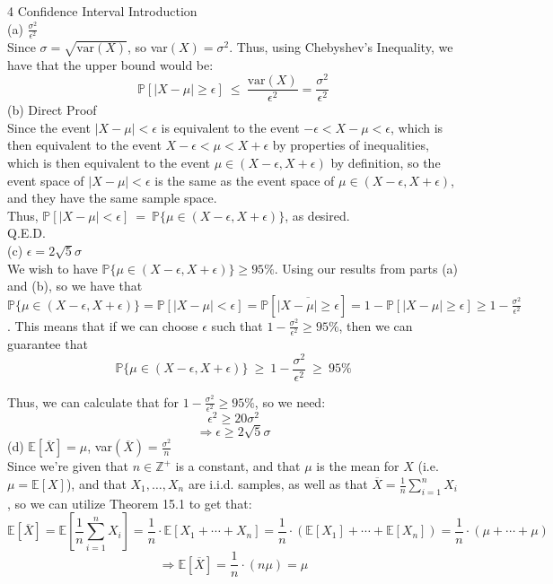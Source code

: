 \documentclass{article}
\begin{document}
{\Large 4 Confidence Interval Introduction} \\[.5cm]
{\color{red} (a) $\frac{\sigma^2}{\epsilon^2}$ } \\

Since $\sigma = \sqrt{\text{var}(X)}$, so var$(X) = \sigma^2$. Thus, using Chebyshev's Inequality, we have that the upper bound would be:
$$\mathbb{P}[|X-\mu| \geq \epsilon]\ \leq\ \frac{\text{var}(X)}{\epsilon^2} = \frac{\sigma^2}{\epsilon^2}$$
{\color{red} (b) Direct Proof } \\

Since the event $|X-\mu|<\epsilon$
is equivalent to the event $-\epsilon < X-\mu < \epsilon$,
which is then equivalent to the event $X-\epsilon < \mu < X+\epsilon$ by properties of inequalities,
which is then equivalent to the event $\mu\in(X-\epsilon, X+\epsilon)$ by definition,
so the event space of $|X-\mu|<\epsilon$ is the same as the event space of $\mu\in(X-\epsilon, X+\epsilon)$, and they have the same sample space. \\

Thus, $\mathbb{P}[|X-\mu|<\epsilon]\ =\
\mathbb{P}\big\{\mu\in(X-\epsilon, X+\epsilon)\big\}$, as desired. \\

Q.E.D. \\[.5cm]
{\color{red} (c) $\epsilon = 2\sqrt{5}\sigma$ } \\

We wish to have $\mathbb{P}\big\{\mu\in(X-\epsilon, X+\epsilon)\big\} \geq95\%$. Using our results from parts (a) and (b), so we have that
$\mathbb{P}\big\{\mu\in(X-\epsilon, X+\epsilon)\big\} =
\mathbb{P}[|X-\mu|<\epsilon] =
\mathbb{P}[\overline{|X-\mu|\geq\epsilon}] =
1 - \mathbb{P}[|X-\mu|\geq\epsilon] \geq
1 - \frac{\sigma^2}{\epsilon^2}$. This means that if we can choose $\epsilon$ such that $1 - \frac{\sigma^2}{\epsilon^2}\geq95\%$, then we can guarantee that
$$\mathbb{P}\big\{\mu\in(X-\epsilon, X+\epsilon)\big\} \ \geq\
1 - \frac{\sigma^2}{\epsilon^2}\ \geq\ 95\%$$

Thus, we can calculate that for $1 - \frac{\sigma^2}{\epsilon^2}\geq95\%$, so we need:
$$\epsilon^2 \geq 20\sigma^2$$
$$\Longrightarrow \epsilon \geq 2\sqrt{5}\sigma$$
{\color{red} (d) $\mathbb{E}[\overline{X}] = \mu $,
var$(\overline{X}) = \frac{\sigma^2}{n}$ } \\

Since we're given that $n\in\mathbb{Z^+}$ is a constant, and that $\mu$ is the mean for $X$ (i.e. $\mu = \mathbb{E}[X]$), and that $X_1,\dots,X_n$ are i.i.d. samples, as well as that $\overline{X} = \frac{1}{n} \sum\limits_{i=1}^n X_i$,
so we can utilize Theorem 15.1 to get that:
$$\mathbb{E}[\overline{X}] =
\mathbb{E}[\frac{1}{n} \sum\limits_{i=1}^n X_i] =
\frac{1}{n}\cdot\mathbb{E}[X_1+\cdots+X_n] =
\frac{1}{n}\cdot(\mathbb{E}[X_1] + \cdots + \mathbb{E}[X_n]) =
\frac{1}{n}\cdot(\mu + \cdots + \mu)$$
$$\Longrightarrow \mathbb{E}[\overline{X}] =
\frac{1}{n}\cdot (n\mu) = \mu$$
\end{document}
